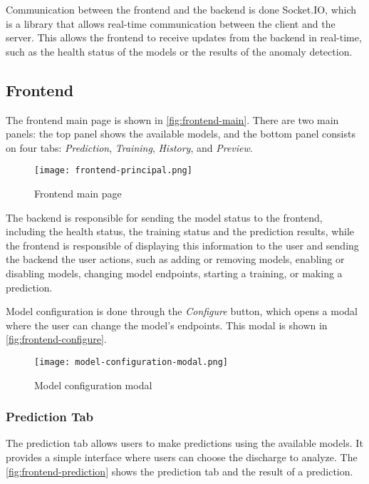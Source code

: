 Communication between the frontend and the backend is done Socket.IO, which is a library that allows real-time communication between the client and the server. This allows the frontend to receive updates from the backend in real-time, such as the health status of the models or the results of the anomaly detection.

\subsection{Frontend}

The frontend main page is shown in \autoref{fig:frontend-main}. There are two main panels: the top panel shows the available models, and the bottom panel consists on four tabs: \textit{Prediction}, \textit{Training}, \textit{History}, and \textit{Preview}.

\begin{figure}[H]
    \centering
    \texttt{[image: frontend-principal.png]}
    \caption{Frontend main page}
    \label{fig:frontend-main}
\end{figure}

The backend is responsible for sending the model status to the frontend, including the health status, the training status and the prediction results, while the frontend is responsible of displaying this information to the user and sending the backend the user actions, such as adding or removing models, enabling or disabling models, changing model endpoints, starting a training, or making a prediction.

Model configuration is done through the \textit{Configure} button, which opens a modal where the user can change the model's endpoints. This modal is shown in \autoref{fig:frontend-configure}.

\begin{figure}[H]
    \centering
    \texttt{[image: model-configuration-modal.png]}
    \caption{Model configuration modal}
    \label{fig:frontend-configure}
\end{figure}

\subsubsection{Prediction Tab}

The prediction tab allows users to make predictions using the available models. It provides a simple interface where users can choose the discharge to analyze. The \autoref{fig:frontend-prediction} shows the prediction tab and the result of a prediction.

